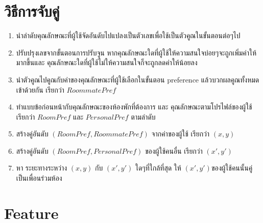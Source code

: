\section{วิธีการจับคู่}
\begin{enumerate}
  \item นำลำดับคุณลักษณะที่ผู้ใช้จัดอันดับไปแปลงเป็นตัวเลขเพื่อใช้เป็นตัวคูณในขั้นตอนต่อๆไป
  \item ปรับปรุงเลขจากขั้นตอนการปรับจูน หากคุณลักษณะใดที่ผู้ใช้ให้ความสนใจบ่อยๆจะถูกเพิ่มค่าให้มากขึ้นและ 
        คุณลักษณะใดที่ผู้ใช้ไม่ให้ความสนใจก็จะถูกลดค่าให้น้อยลง
  \item นำตัวคูณไปคูณกับค่าของคุณลักษณะที่ผู้ใช้เลือกในขั้นตอน preference แล้วบวกผลคูณทั้งหมดเข้าด้วยกัน เรียกว่า $RoommatePref$
  \item ทำแบบข้อก่อนหน้ากับคุณลักษณะของห้องพักที่ต้องการ และ คุณลักษณะตามโปรไฟล์ของผู้ใช้ เรียกว่า $RoomPref$ และ $PersonalPref$ ตามลำดับ
  \item สร้างคู่อันดับ $(RoomPref, RoommatePref)$ จากค่าของผู้ใช้ เรียกว่า $(x,y)$ 
  \item สร้างคู่อันดับ $(RoomPref, PersonalPref)$ ของผู้ใช้คนอื่น เรียกว่า $(x',y')$
  \item หา ระยะทางระหว่าง $(x,y)$ กับ $(x',y')$ ใดๆที่ใกล้ที่สุด ให้ $(x',y')$ของผู้ใช้คนนั้นคู่เป็นเพื่อนร่วมห้อง
\end{enumerate}

\section{Feature}
